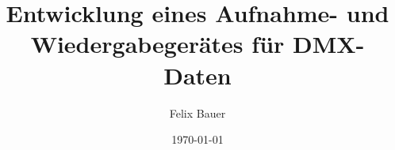 
\title{Entwicklung eines Aufnahme- und Wiedergabegerätes für DMX-Daten}
\author{Felix Bauer}
\date{\today}
\maketitle
\newpage